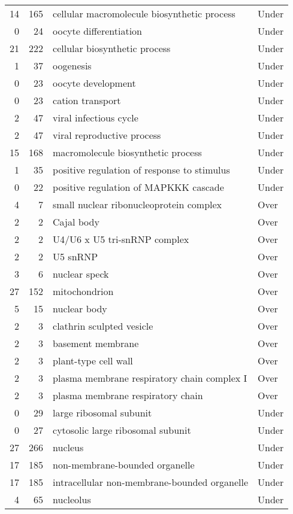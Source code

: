 \documentclass[10pt]{bmc_article}
\newenvironment{bmcformat}{\begin{raggedright}\baselineskip20pt\sloppy\setboolean{publ}{false}}{\end{raggedright}\baselineskip20pt\sloppy}
\begin{document}
\begin{bmcformat}
\begin{longtable}{rrll}
   14 & 165 & cellular macromolecule biosynthetic process & Under \\ 
    0 &  24 & oocyte differentiation & Under \\ 
   21 & 222 & cellular biosynthetic process & Under \\ 
    1 &  37 & oogenesis & Under \\ 
    0 &  23 & oocyte development & Under \\ 
    0 &  23 & cation transport & Under \\ 
    2 &  47 & viral infectious cycle & Under \\ 
    2 &  47 & viral reproductive process & Under \\ 
   15 & 168 & macromolecule biosynthetic process & Under \\ 
    1 &  35 & positive regulation of response to stimulus & Under \\ 
    0 &  22 & positive regulation of MAPKKK cascade & Under \\ 
   \hline
  4 &   7 & small nuclear ribonucleoprotein complex & Over \\ 
    2 &   2 & Cajal body & Over \\ 
    2 &   2 & U4/U6 x U5 tri-snRNP complex & Over \\ 
    2 &   2 & U5 snRNP & Over \\ 
    3 &   6 & nuclear speck & Over \\ 
   27 & 152 & mitochondrion & Over \\ 
    5 &  15 & nuclear body & Over \\ 
    2 &   3 & clathrin sculpted vesicle & Over \\ 
    2 &   3 & basement membrane & Over \\ 
    2 &   3 & plant-type cell wall & Over \\ 
    2 &   3 & plasma membrane respiratory chain complex I & Over \\ 
    2 &   3 & plasma membrane respiratory chain & Over \\ 
    0 &  29 & large ribosomal subunit & Under \\ 
    0 &  27 & cytosolic large ribosomal subunit & Under \\ 
   27 & 266 & nucleus & Under \\ 
   17 & 185 & non-membrane-bounded organelle & Under \\ 
   17 & 185 & intracellular non-membrane-bounded organelle & Under \\ 
    4 &  65 & nucleolus & Under \\ 
   \hline
\hline
\end{longtable}

\end{bmcformat}
\end{document}
